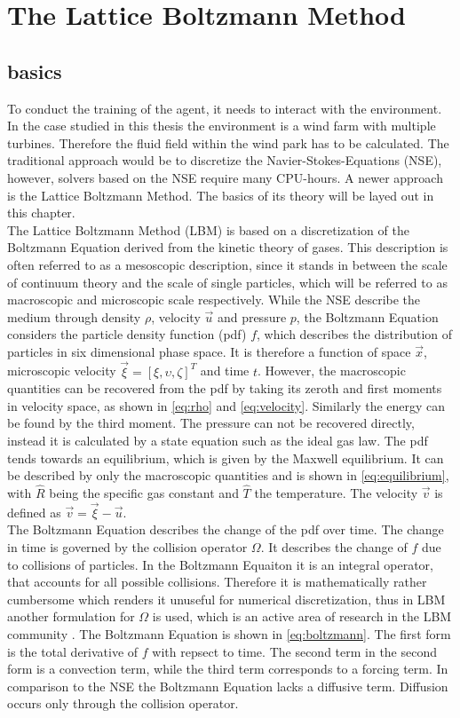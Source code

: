 \section{The Lattice Boltzmann Method}
\label{sec:LBM}
\subsection{basics}
To conduct the training of the agent, it needs to interact with the environment. In the case studied in this thesis the environment is a wind farm with multiple turbines. Therefore the fluid field within the wind park has to be calculated. The traditional approach would be to discretize the Navier-Stokes-Equations (NSE), however, solvers based on the NSE require many CPU-hours. A newer approach is the Lattice Boltzmann Method. The basics of its theory will be layed out in this chapter. \\ 
The Lattice Boltzmann Method (LBM) is based on a discretization of the Boltzmann Equation derived from the kinetic theory of gases. This description is often referred to as a mesoscopic description, since it stands in  between the scale of continuum theory and the scale of single particles, which will be referred to as macroscopic and microscopic scale respectively. While the NSE describe the medium through density $\rho$, velocity $\vec{u}$ and pressure $p$, the Boltzmann Equation considers the particle density function (pdf) $f$, which describes the distribution of particles in six dimensional phase space. It is therefore a function of space $\vec{x}$, microscopic velocity $\vec{\xi} = [\xi, \upsilon, \zeta]^T$ and time $t$. However, the macroscopic quantities can be recovered from the pdf by taking its zeroth and first moments in velocity space, as shown in \eqref{eq:rho} and \eqref{eq:velocity}. Similarly the energy can be found by the third moment. The pressure can not be recovered directly, instead it is calculated by a state equation such as the ideal gas law. The pdf tends towards an equilibrium, which is given by the Maxwell equilibrium. It can be described by only the macroscopic quantities and is shown in \eqref{eq:equilibrium}, with $\hat{R}$ being the specific gas constant and $\hat{T}$ the temperature. The velocity $\vec{v}$ is defined as $\vec{v} = \vec{\xi}-\vec{u}$.\cite[p. 15- 21]{kruger_lattice_2017} \\
The Boltzmann Equation describes the change of the pdf over time. The change in time is governed by the collision operator $\Omega$. It describes the change of $f$ due to collisions of particles. In the Boltzmann Equaiton it is an integral operator, that accounts for all possible collisions. Therefore it is mathematically rather cumbersome which renders it unuseful for numerical discretization, thus in LBM another formulation for $\Omega$ is used, which is an active area of research in the LBM community \cite{coreixas_comprehensive_2019}. The Boltzmann Equation is shown in \eqref{eq:boltzmann}. The first form is the total derivative of $f$ with repsect to time. The second term in the second form is a convection term, while the third term corresponds to a forcing term. In comparison to the NSE the Boltzmann Equation lacks a diffusive term. Diffusion occurs only through the collision operator. \cite[p. 21]{kruger_lattice_2017}
